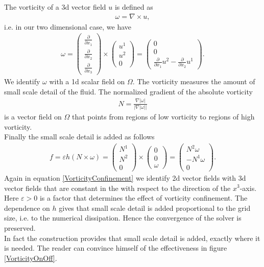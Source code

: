 \documentclass[a4paper,10pt,oneside,final,german,openbib,pdftex,titlepage]{scrbook}
\begin{document}
The vorticity of a 3d vector field $u$ is defined as
\begin{align*}
	\omega = \nabla \times u,
\end{align*}
i.e. in our two dimensional case, we have
\begin{align*}
	\omega = \left( \begin{matrix}
	\frac{\partial}{\partial x_1} \\ \frac{\partial}{\partial x_2} \\ \frac{\partial}{\partial x_3}
	\end{matrix} \right) \times 
	\left( \begin{matrix}
	u^1 \\ u^2 \\ 0
	\end{matrix} \right) = \left( \begin{matrix}
	 0\\ 0 \\ \frac{\partial}{\partial x_1} u^2 - \frac{\partial}{\partial x_2} u^1 
	\end{matrix} \right).
\end{align*}
We identify $\omega$ with a 1d scalar field on $\Omega$. The vorticity measures the amount of small scale detail of the fluid. The normalized gradient of the absolute vorticity
\begin{align*}
	N = \frac{\nabla |\omega |}{|\nabla  |\omega ||}
\end{align*}
is a vector field on $\Omega$ that points from regions of low vorticity to regions of high vorticity.\\
Finally the small scale detail is added as follows
\begin{align}
	f = \varepsilon h (N\times \omega ) = \left( \begin{matrix}
	N^1\\ N^2 \\0
	\end{matrix}  \right) \times \left( \begin{matrix} 0\\ 0\\ \omega \end{matrix} \right) = \left( \begin{matrix}
	N^2 \omega \\ -N^1 \omega \\ 0
	\end{matrix} \right). \label{VorticityConfinement}
\end{align}
Again in equation \ref{VorticityConfinement} we identify 2d vector fields with 3d vector fields that are constant in the with respect to the direction of the $x^3$-axis.
Here $\varepsilon >0$ is a factor that determines the effect of vorticity confinement. The dependence on $h$ gives that small scale detail is added proportional to the grid size, i.e. to the numerical dissipation. Hence the convergence of the solver is preserved.\\
In fact the construction provides that small scale detail is added, exactly where it is needed. The reader can convince himself of the effectiveness in figure \ref{VorticityOnOff}.
\end{document}
